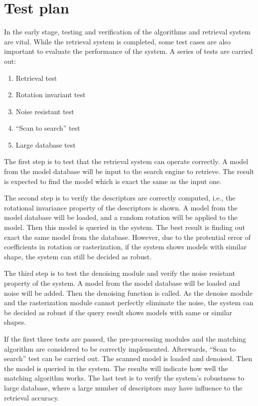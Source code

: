 \section{Test plan} \label{sec:test}

In the early stage, testing and verification of the algorithms and retrieval system are vital. While the retrieval system is completed, some test cases are also important to evaluate the performance of the system. A series of tests are carried out:

\begin{enumerate}[1.]
\item Retrieval test
\item Rotation invariant test
\item Noise resistant test
\item ``Scan to search'' test
\item Large database test
\end{enumerate}

The first step is to test that the retrieval system can operate correctly. A model from the model database will be input to the search engine to retrieve. The result is expected to find the model which is exact the same as the input one. 

The second step is to verify the descriptors are correctly computed, i.e., the rotational invariance property of the descriptors is shown. A model from the model database will be loaded, and a random rotation will be applied to the model. Then this model is queried in the system. The best result is finding out exact the same model from the database. However, due to the protential error of coefficients in rotation or rasterization, if the system shows models with similar shape, the system can still be decided as robust. 

The third step is to test the denoising module and verify the noise resistant property of the system. A model from the model database will be loaded and noise will be added. Then the denoising function is called. As the denoise module and the rasterization module cannot perfectly eliminate the noise, the system can be decided as robust if the query result shows models with same or similar shapes. 

If the first three tests are passed, the pre-processing modules and the matching algorithm are considered to be correctly implemented. Afterwards, ``Scan to search'' test can be carried out. The scanned model is loaded and denoised. Then the model is queried in the system. The results will indicate how well the matching algorithm works. The last test is to verify the system's robustness to large database, where a large number of descriptors may have influence to the retrieval accuracy. 

